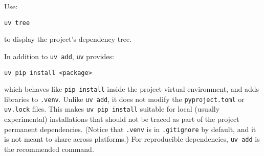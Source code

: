 Use:
\begin{lstlisting}
uv tree
\end{lstlisting}
to display the project’s dependency tree.

In addition to \verb|uv add|, \verb|uv| provides:
\begin{lstlisting}
uv pip install <package>
\end{lstlisting}
which behaves like \verb|pip install| inside the project virtual environment, and adds libraries to \verb|.venv|. Unlike \verb|uv add|, it does not modify the \verb|pyproject.toml| or \verb|uv.lock| files. This makes \verb|uv pip install| suitable for local (usually experimental) installations that should not be traced as part of the project permanent dependencies. (Notice that \verb|.venv| is in \verb|.gitignore| by default, and it is not meant to share across platforms.) For reproducible dependencies, \verb|uv add| is the recommended command.











